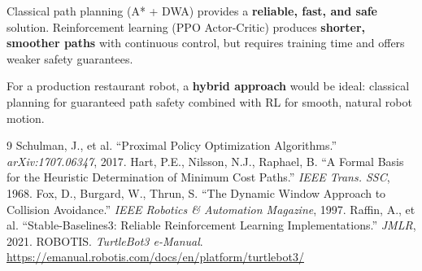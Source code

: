 \documentclass[12pt, a4paper]{article}
\begin{document}
Classical path planning (A* + DWA) provides a \textbf{reliable, fast, and safe} solution. Reinforcement learning (PPO Actor-Critic) produces \textbf{shorter, smoother paths} with continuous control, but requires training time and offers weaker safety guarantees.

For a production restaurant robot, a \textbf{hybrid approach} would be ideal: classical planning for guaranteed path safety combined with RL for smooth, natural robot motion.

\begin{thebibliography}{9}
 Schulman, J., et al. ``Proximal Policy Optimization Algorithms.'' \textit{arXiv:1707.06347}, 2017.
 Hart, P.E., Nilsson, N.J., Raphael, B. ``A Formal Basis for the Heuristic Determination of Minimum Cost Paths.'' \textit{IEEE Trans. SSC}, 1968.
 Fox, D., Burgard, W., Thrun, S. ``The Dynamic Window Approach to Collision Avoidance.'' \textit{IEEE Robotics \& Automation Magazine}, 1997.
 Raffin, A., et al. ``Stable-Baselines3: Reliable Reinforcement Learning Implementations.'' \textit{JMLR}, 2021.
 ROBOTIS. \textit{TurtleBot3 e-Manual}. \url{https://emanual.robotis.com/docs/en/platform/turtlebot3/}
\end{thebibliography}
\end{document}
